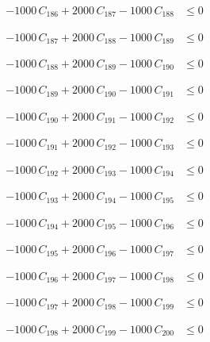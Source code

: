 \documentclass[a4paper,11pt]{article}
\begin{document}
\begin{align}
-1000\,C_{186} + 2000\,C_{187} - 1000\,C_{188} &\leq 0 \nonumber
\end{align}

\begin{align}
-1000\,C_{187} + 2000\,C_{188} - 1000\,C_{189} &\leq 0 \nonumber
\end{align}

\begin{align}
-1000\,C_{188} + 2000\,C_{189} - 1000\,C_{190} &\leq 0 \nonumber
\end{align}

\begin{align}
-1000\,C_{189} + 2000\,C_{190} - 1000\,C_{191} &\leq 0 \nonumber
\end{align}

\begin{align}
-1000\,C_{190} + 2000\,C_{191} - 1000\,C_{192} &\leq 0 \nonumber
\end{align}

\begin{align}
-1000\,C_{191} + 2000\,C_{192} - 1000\,C_{193} &\leq 0 \nonumber
\end{align}

\begin{align}
-1000\,C_{192} + 2000\,C_{193} - 1000\,C_{194} &\leq 0 \nonumber
\end{align}

\begin{align}
-1000\,C_{193} + 2000\,C_{194} - 1000\,C_{195} &\leq 0 \nonumber
\end{align}

\begin{align}
-1000\,C_{194} + 2000\,C_{195} - 1000\,C_{196} &\leq 0 \nonumber
\end{align}

\begin{align}
-1000\,C_{195} + 2000\,C_{196} - 1000\,C_{197} &\leq 0 \nonumber
\end{align}

\begin{align}
-1000\,C_{196} + 2000\,C_{197} - 1000\,C_{198} &\leq 0 \nonumber
\end{align}

\begin{align}
-1000\,C_{197} + 2000\,C_{198} - 1000\,C_{199} &\leq 0 \nonumber
\end{align}

\begin{align}
-1000\,C_{198} + 2000\,C_{199} - 1000\,C_{200} &\leq 0 \nonumber
\end{align}
\end{document}
